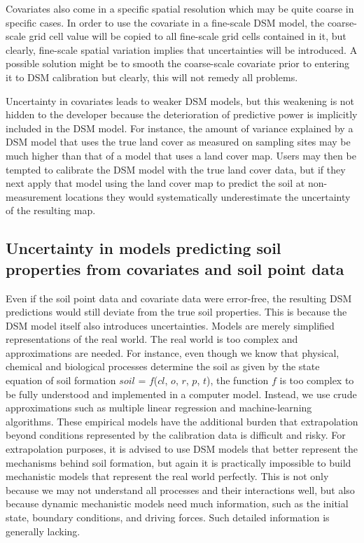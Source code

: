 \documentclass[10pt,b5paper,]{book}
\theoremstyle{definition}
\theoremstyle{definition}
\theoremstyle{definition}
\theoremstyle{remark}
\begin{document}
Covariates also come in a specific spatial resolution which may be quite
coarse in specific cases. In order to use the covariate in a fine-scale
DSM model, the coarse-scale grid cell value will be copied to all
fine-scale grid cells contained in it, but clearly, fine-scale spatial
variation implies that uncertainties will be introduced. A possible
solution might be to smooth the coarse-scale covariate prior to entering
it to DSM calibration but clearly, this will not remedy all problems.

Uncertainty in covariates leads to weaker DSM models, but this weakening
is not hidden to the developer because the deterioration of predictive
power is implicitly included in the DSM model. For instance, the amount
of variance explained by a DSM model that uses the true land cover as
measured on sampling sites may be much higher than that of a model that
uses a land cover map. Users may then be tempted to calibrate the DSM
model with the true land cover data, but if they next apply that model
using the land cover map to predict the soil at non-measurement
locations they would systematically underestimate the uncertainty of the
resulting map.

\hypertarget{uncertainty-in-models-predicting-soil-properties-from-covariates-and-soil-point-data}{%
\subsection{Uncertainty in models predicting soil properties from
covariates and soil point
data}\label{uncertainty-in-models-predicting-soil-properties-from-covariates-and-soil-point-data}}

Even if the soil point data and covariate data were error-free, the
resulting DSM predictions would still deviate from the true soil
properties. This is because the DSM model itself also introduces
uncertainties. Models are merely simplified representations of the real
world. The real world is too complex and approximations are needed. For
instance, even though we know that physical, chemical and biological
processes determine the soil as given by the state equation of soil
formation \(soil\) = \(f\)(\(cl\), \(o\), \(r\), \(p\), \(t\)), the
function \(f\) is too complex to be fully understood and implemented in
a computer model. Instead, we use crude approximations such as multiple
linear regression and machine-learning algorithms. These empirical
models have the additional burden that extrapolation beyond conditions
represented by the calibration data is difficult and risky. For
extrapolation purposes, it is advised to use DSM models that better
represent the mechanisms behind soil formation, but again it is
practically impossible to build mechanistic models that represent the
real world perfectly. This is not only because we may not understand all
processes and their interactions well, but also because dynamic
mechanistic models need much information, such as the initial state,
boundary conditions, and driving forces. Such detailed information is
generally lacking.
\end{document}
